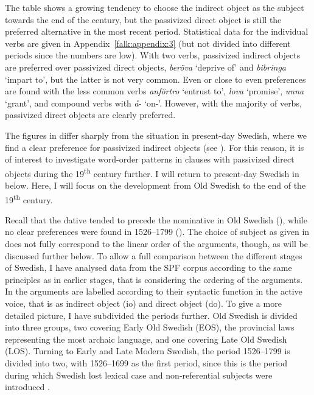 \documentclass[output=paper]{langscibook}
\begin{document}
The table shows a growing tendency to choose the indirect object as the subject towards the end of the century, but the passivized direct object is still the preferred alternative in the most recent period. Statistical data for the individual verbs are given in Appendix~\ref{falk:appendix:3} (but not divided into different periods since the numbers are low). With two verbs, passivized indirect objects are preferred over passivized direct objects, \textit{beröva} ‘deprive of’ and \textit{bibringa} ‘impart to’, but the latter is not very common. Even or close to even preferences are found with the less common verbs \textit{anförtro} ‘entrust to’, \textit{lova} ‘promise’, \textit{unna} ‘grant’, and compound verbs with \textit{å}{}- ‘on-’. However, with the majority of verbs, passivized direct objects are clearly preferred.


The figures in  differ sharply from the situation in present-day Swedish, where we find a clear preference for passivized indirect objects (see ). For this reason, it is of interest to investigate word-order patterns in clauses with passivized direct objects during the 19\textsuperscript{th} century further. I will return to present-day Swedish in  below. Here, I will focus on the development from Old Swedish to the end of the 19\textsuperscript{th} century.



Recall that the dative tended to precede the nominative in Old Swedish (), while no clear preferences were found in 1526–1799 (). The choice of subject as given in  does not fully correspond to the linear order of the arguments, though, as will be discussed further below. To allow a full comparison between the different stages of Swedish, I have analysed data from the SPF corpus according to the same principles as in earlier stages, that is considering the ordering of the arguments. In  the arguments are labelled according to their syntactic function in the active voice, that is as indirect object (io) and direct object (do). To give a more detailed picture, I have subdivided the periods further. Old Swedish is divided into three groups, two covering Early Old Swedish (EOS), the provincial laws representing the most archaic language, and one covering Late Old Swedish (LOS). Turning to Early and Late Modern Swedish, the period 1526–1799 is divided into two, with 1526–1699 as the first period, since this is the period during which Swedish lost lexical case and non-referential subjects were introduced \citep{Falk1993}.
\end{document}
